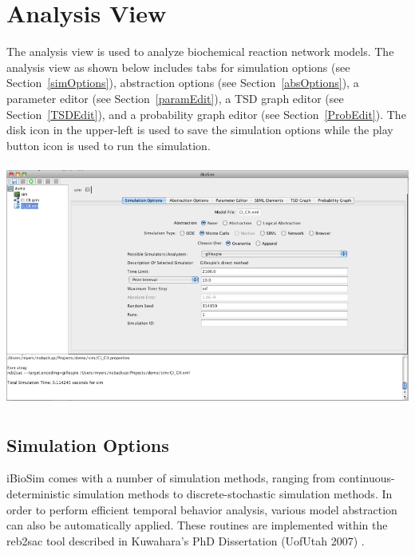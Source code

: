 \documentclass[titlepage,11pt]{article}
\begin{document}
\clearpage

\section{\label{Analysis}Analysis View}

\noindent
The analysis view is used to analyze biochemical reaction
network models. The analysis view as shown below includes tabs for 
simulation options (see Section~\ref{simOptions}), 
abstraction options (see Section~\ref{absOptions}), 
a parameter editor (see Section~\ref{paramEdit}), 
a TSD graph editor (see Section~\ref{TSDEdit}), and a 
probability graph editor (see Section~\ref{ProbEdit}).
The disk icon in the upper-left is used to save the simulation options
while the play button icon is used to run the simulation.
\begin{center}
\includegraphics[height=80mm]{screenshots/analysisView}
\end{center}

\subsection{\label{simOptions}Simulation Options}

\noindent
iBioSim comes with a number of simulation methods, ranging
from continuous-deterministic simulation methods to
discrete-stochastic simulation methods. In order to perform
efficient temporal behavior analysis, various model abstraction
can also be automatically applied.  These routines are implemented
within the reb2sac tool described in 
Kuwahara's PhD Dissertation (UofUtah 2007)
. 
\end{document}
